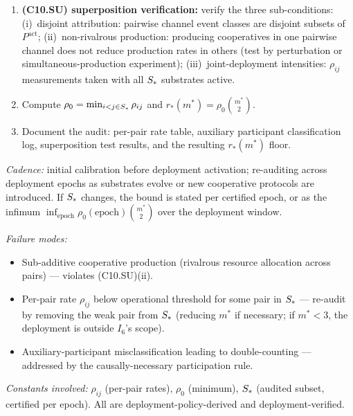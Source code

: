\begin{enumerate}
\begin{itemize}
  \item For cooperatives with mixed-mode auxiliary participants
    (sometimes pre-production, sometimes post-production), split
    the event stream by realized support: each event instance is
    classified individually based on the realized participation.
  \end{itemize}
\item \textbf{(C10.SU) superposition verification:} verify the
  three sub-conditions:
  (i)~disjoint attribution: pairwise channel event classes are
  disjoint subsets of $P^{\mathrm{act}}$;
  (ii)~non-rivalrous production: producing cooperatives in one
  pairwise channel does not reduce production rates in others
  (test by perturbation or simultaneous-production experiment);
  (iii)~joint-deployment intensities: $\rho_{ij}$ measurements
  taken with all $S_*$ substrates active.
\item Compute $\rho_0 = \min_{i<j \in S_*} \rho_{ij}$ and
  $r_*(m^*) = \rho_0 \binom{m^*}{2}$.
\item Document the audit: per-pair rate table, auxiliary
  participant classification log, superposition test results, and
  the resulting $r_*(m^*)$ floor.
\end{enumerate}

\emph{Cadence:} initial calibration before deployment activation;
re-auditing across deployment epochs as substrates evolve or new
cooperative protocols are introduced.  If $S_*$ changes,
the bound is stated per certified epoch, or as the infimum
$\inf_{\mathrm{epoch}} \rho_0(\mathrm{epoch}) \binom{m^*}{2}$ over
the deployment window.

\emph{Failure modes:}
\begin{itemize}
\item Sub-additive cooperative production (rivalrous resource
  allocation across pairs) — violates (C10.SU)(ii).
\item Per-pair rate $\rho_{ij}$ below operational threshold for
  some pair in $S_*$ — re-audit by removing the weak pair from
  $S_*$ (reducing $m^*$ if necessary; if $m^* < 3$, the
  deployment is outside $I_6$'s scope).
\item Auxiliary-participant misclassification leading to
  double-counting — addressed by the causally-necessary
  participation rule.
\end{itemize}

\emph{Constants involved:} $\rho_{ij}$ (per-pair rates), $\rho_0$
(minimum), $S_*$ (audited subset, certified per epoch).  All
are deployment-policy-derived and deployment-verified.

